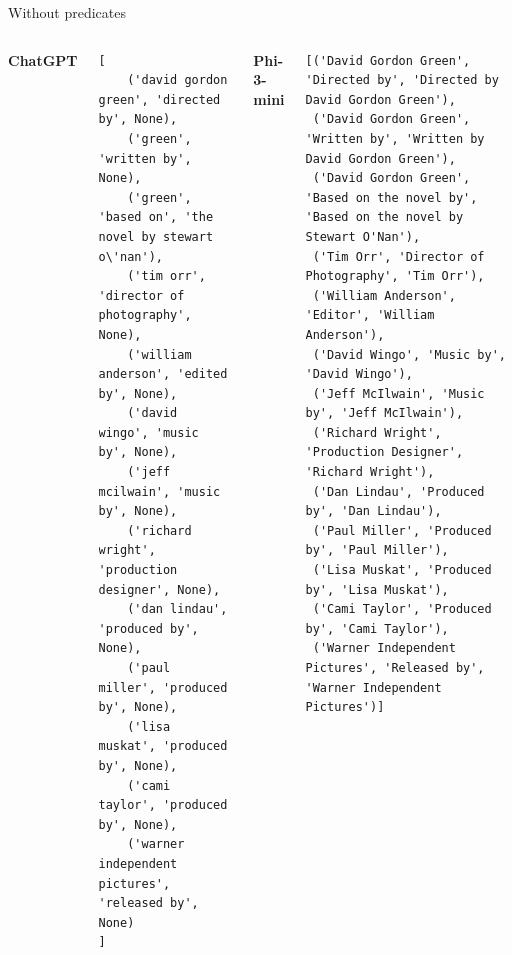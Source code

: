 \documentclass[aspectratio=169,xcolor=dvipsnames]{beamer}
\begin{document}
\begin{frame}[fragile]{Without predicates}
\begin{columns}[c]
\textbf{ChatGPT}
\begin{verbatim}
[
    ('david gordon green', 'directed by', None),
    ('green', 'written by', None),
    ('green', 'based on', 'the novel by stewart o\'nan'),
    ('tim orr', 'director of photography', None),
    ('william anderson', 'edited by', None),
    ('david wingo', 'music by', None),
    ('jeff mcilwain', 'music by', None),
    ('richard wright', 'production designer', None),
    ('dan lindau', 'produced by', None),
    ('paul miller', 'produced by', None),
    ('lisa muskat', 'produced by', None),
    ('cami taylor', 'produced by', None),
    ('warner independent pictures', 'released by', None)
]
\end{verbatim}
\textbf{Phi-3-mini}
\begin{verbatim}
[('David Gordon Green', 'Directed by', 'Directed by David Gordon Green'),
 ('David Gordon Green', 'Written by', 'Written by David Gordon Green'),
 ('David Gordon Green', 'Based on the novel by', 'Based on the novel by Stewart O'Nan'),
 ('Tim Orr', 'Director of Photography', 'Tim Orr'),
 ('William Anderson', 'Editor', 'William Anderson'),
 ('David Wingo', 'Music by', 'David Wingo'),
 ('Jeff McIlwain', 'Music by', 'Jeff McIlwain'),
 ('Richard Wright', 'Production Designer', 'Richard Wright'),
 ('Dan Lindau', 'Produced by', 'Dan Lindau'),
 ('Paul Miller', 'Produced by', 'Paul Miller'),
 ('Lisa Muskat', 'Produced by', 'Lisa Muskat'),
 ('Cami Taylor', 'Produced by', 'Cami Taylor'),
 ('Warner Independent Pictures', 'Released by', 'Warner Independent Pictures')]
\end{verbatim}
\end{columns}
\end{frame}
\end{document}
